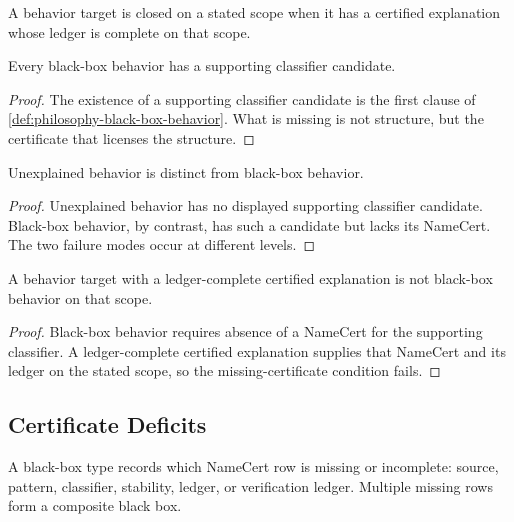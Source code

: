 \begin{definition}
\label{def:philosophy-closed-explanation-behavior}
A behavior target is closed on a stated scope when it has a certified
explanation whose ledger is complete on that scope.
\end{definition}

\begin{theorem}
\label{thm:philosophy-black-boxes-have-support-structure}
Every black-box behavior has a supporting classifier candidate.
\end{theorem}
\begin{proof}
The existence of a supporting classifier candidate is the first clause
of \autoref{def:philosophy-black-box-behavior}. What is missing is not
structure, but the certificate that licenses the structure.
\end{proof}

\begin{theorem}
\label{thm:philosophy-unexplained-not-black-box}
Unexplained behavior is distinct from black-box behavior.
\end{theorem}
\begin{proof}
Unexplained behavior has no displayed supporting classifier candidate.
Black-box behavior, by contrast, has such a candidate but lacks its
NameCert. The two failure modes occur at different levels.
\end{proof}

\begin{theorem}
\label{thm:philosophy-closed-explanation-not-black-box}
A behavior target with a ledger-complete certified explanation is not
black-box behavior on that scope.
\end{theorem}
\begin{proof}
Black-box behavior requires absence of a NameCert for the supporting
classifier. A ledger-complete certified explanation supplies that
NameCert and its ledger on the stated scope, so the missing-certificate
condition fails.
\end{proof}

\subsection{Certificate Deficits}
\label{subsec:philosophy-black-box-certificate-deficits}

\begin{definition}
\label{def:philosophy-black-box-type}
A black-box type records which NameCert row is missing or incomplete:
source, pattern, classifier, stability, ledger, or verification ledger.
Multiple missing rows form a composite black box.
\end{definition}

